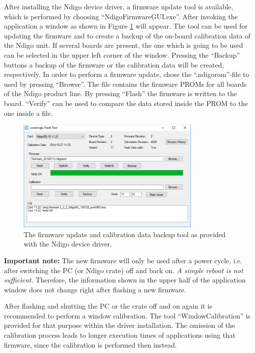         After installing the Ndigo device driver, a firmware update tool is available, which is performed by choosing ``NdigoFirmwareGUI.exe''. After invoking the application a window as shown in Figure \ref{fig:Firmware} will appear. The tool can be used for updating the firmware and to create a backup of the on-board calibration data of the Ndigo unit. If several boards are present, the one which is going to be used can be selected in the upper left corner of the window. Pressing the ``Backup'' buttons a backup of the firmware or the calibration data will be created, respectively. In order to perform a firmware update, chose the ``.ndigorom''-file to used by pressing ``Browse''. The file contains the firmware PROMs for all boards of the Ndigo product line. By pressing ``Flash'' the firmware is written to the board. ``Verify'' can be used to compare the data stored inside the PROM to the one inside a file.\par
        
        \begin{figure}[ht]
            \begin{center}
                \includegraphics[width=0.8\textwidth]{figures/Firmware.pdf}
                \caption{\label{fig:Firmware}The firmware update and calibration data backup tool as provided with the Ndigo device driver.}
            \end{center}
        \end{figure}

\textbf{Important note:} The new firmware will only be used after a power cycle, i.e. after switching the PC (or Ndigo crate) off and back on. \emph{A simple reboot is not sufficient.} Therefore, the information shown in the upper half of the application window does not change right after flashing a new firmware.\par
After flashing and shutting the PC or the crate off and on again it is recommended to perform a window calibration. The tool ``WindowCalibration'' is provided for that purpose within the driver installation. The omission of the calibration process leads to longer execution times of applications using that firmware, since the calibration is performed then instead.
    
